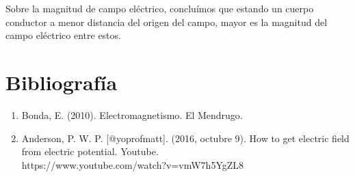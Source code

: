 \documentclass{article}
\begin{document}
Sobre la magnitud de campo eléctrico, concluímos que estando un cuerpo conductor a menor distancia del origen del campo, mayor es la magnitud del campo eléctrico entre estos.

\section{Bibliografía}

\begin{enumerate}
    \item Bonda, E. (2010). Electromagnetismo. El Mendrugo.
    \item Anderson, P. W. P. [@yoprofmatt]. (2016, octubre 9). How to get electric field from electric potential. Youtube.\\https://www.youtube.com/watch?v=vmW7h5YgZL8

\end{enumerate}
\end{document}
